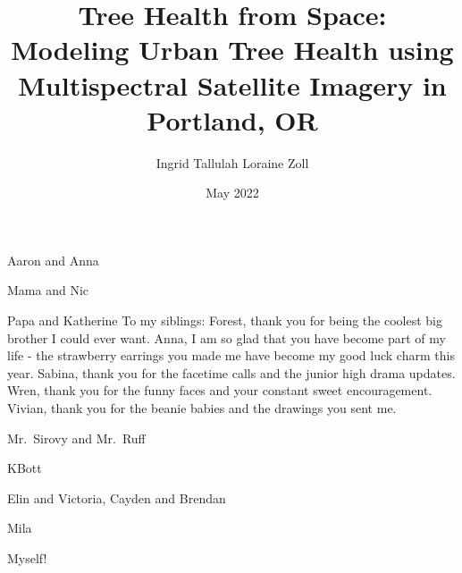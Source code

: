 \documentclass[12pt,twoside]{reedthesis}
\title{Tree Health from Space: \\[1ex] Modeling Urban Tree Health using Multispectral Satellite Imagery in Portland, OR}
\author{Ingrid Tallulah Loraine Zoll}
\date{May 2022}
\begin{document}
  \maketitle

\frontmatter %
\pagestyle{empty} %
  \begin{acknowledgements}
    Aaron and Anna

    Mama and Nic

    Papa and Katherine
    To my siblings: Forest, thank you for being the coolest big brother I could ever want. Anna, I am so glad that you have become part of my life - the strawberry earrings you made me have become my good luck charm this year. Sabina, thank you for the facetime calls and the junior high drama updates. Wren, thank you for the funny faces and your constant sweet encouragement. Vivian, thank you for the beanie babies and the drawings you sent me.

    Mr.~Sirovy and Mr.~Ruff

    KBott

    Elin and Victoria, Cayden and Brendan

    Mila

    Myself!
  \end{acknowledgements}
\end{document}

